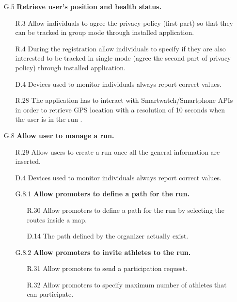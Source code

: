 \begin{enumerate}
	\begin{enumerate}
	\item [G.5] \textbf{Retrieve user's position and health status.}
		\begin{enumerate}
		\item [R.3] Allow individuals to agree the privacy policy (first part) so that they can be tracked in group mode through installed application.  
		\item [R.4] During the registration allow individuals to specify if they are also interested to be tracked in single mode (agree the second part of privacy policy) through installed application. 
		\item [D.4] Devices used to monitor individuals always report correct values.
		\item [R.28] The application has to interact with Smartwatch/Smartphone APIs in order to retrieve GPS location with a resolution of 10 seconds when the user is in the run .
		\end{enumerate}
		
	\item [G.8] \textbf{Allow user to manage a run.}
		\begin{enumerate}
		\item [R.29] Allow users to create a run once all the general information are inserted.
		\item [D.4] Devices used to monitor individuals always report correct values.
			
		\item [G.8.1] \textbf{Allow promoters to define a path for the run.}
			\begin{enumerate}
			\item [R.30] Allow promoters to define a path for the run by selecting the routes inside a map.
			\item [D.14] The path defined by the organizer actually exist.
			\end{enumerate}
			
		\item [G.8.2] \textbf{Allow promoters to invite athletes to the run.}
			\begin{enumerate}
			\item [R.31] Allow promoters to send a participation request.
			\item [R.32] Allow promoters to specify maximum number of athletes that can participate.
			\end{enumerate}
	\end{enumerate}
	

\end{enumerate}
\end{enumerate}
